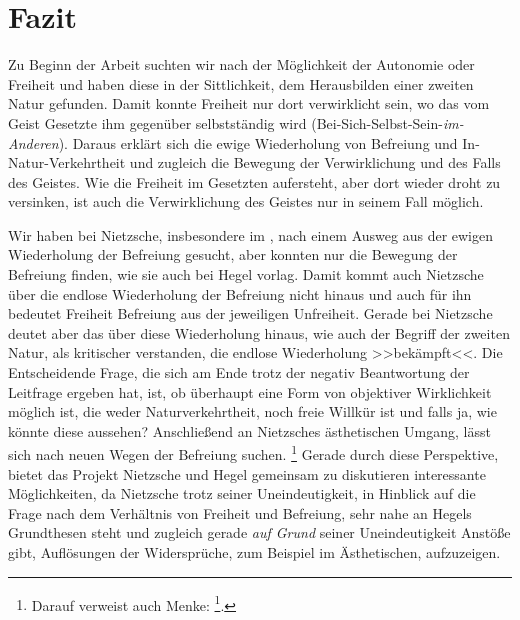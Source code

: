 \documentclass[12pt, a4paper, openany]{report}
\begin{document}
\chapter{Fazit}
Zu Beginn der Arbeit suchten wir nach der Möglichkeit der Autonomie oder Freiheit und haben diese in der Sittlichkeit, dem Herausbilden einer zweiten Natur gefunden.
Damit konnte Freiheit nur dort verwirklicht sein, wo das vom Geist Gesetzte ihm gegenüber selbstständig wird (Bei-Sich-Selbst-Sein-\emph{im-Anderen}).
Daraus erklärt sich die ewige Wiederholung von Befreiung und In-Natur-Verkehrtheit und zugleich die Bewegung der Verwirklichung und des Falls des Geistes. 
Wie die Freiheit im Gesetzten aufersteht, aber dort wieder droht zu versinken, ist auch die Verwirklichung des Geistes nur in seinem Fall möglich.

Wir haben bei Nietzsche, insbesondere im , nach einem Ausweg aus der ewigen Wiederholung der Befreiung gesucht, aber konnten nur die Bewegung der Befreiung finden, wie sie auch bei Hegel vorlag. 
Damit kommt auch Nietzsche über die endlose Wiederholung der Befreiung nicht hinaus und auch für ihn bedeutet Freiheit Befreiung aus der jeweiligen Unfreiheit. 
Gerade bei Nietzsche deutet aber das  über diese Wiederholung hinaus, wie auch der Begriff der zweiten Natur, als kritischer verstanden, die endlose Wiederholung >>bekämpft<<. 
Die Entscheidende Frage, die sich am Ende trotz der negativ Beantwortung der Leitfrage ergeben hat, ist, ob überhaupt eine Form von objektiver Wirklichkeit möglich ist, die weder Naturverkehrtheit, noch freie Willkür ist und falls ja, wie könnte diese aussehen?
Anschließend an Nietzsches ästhetischen Umgang, lässt sich nach neuen Wegen der Befreiung suchen.%
\footnote{
    Darauf verweist auch Menke: \footcite[][50]{menke_autonomie_2018}.
}
Gerade durch diese Perspektive, bietet das Projekt Nietzsche und Hegel gemeinsam zu diskutieren interessante Möglichkeiten, da Nietzsche trotz seiner Uneindeutigkeit, in Hinblick auf die Frage nach dem Verhältnis von Freiheit und Befreiung, sehr nahe an Hegels Grundthesen steht und zugleich gerade \emph{auf Grund} seiner Uneindeutigkeit Anstöße gibt, Auflösungen der Widersprüche, zum Beispiel im Ästhetischen, aufzuzeigen.

\backmatter
\printbibliography
 
\end{document}
